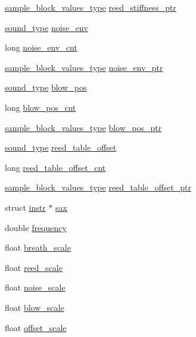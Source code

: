 \begin{DoxyCompactItemize}
\hyperlink{sound_8h_a83d17f7b465d1591f27cd28fc5eb8a03}{sample\+\_\+block\+\_\+values\+\_\+type} \hyperlink{structsax__all__susp__struct_af3fb547480291d7d9a161baf6c16c3d1}{reed\+\_\+stiffness\+\_\+ptr}
\item 
\hyperlink{sound_8h_a792cec4ed9d6d636d342d9365ba265ea}{sound\+\_\+type} \hyperlink{structsax__all__susp__struct_ae4c993c36179cc4d0f6c319f86007f02}{noise\+\_\+env}
\item 
long \hyperlink{structsax__all__susp__struct_ae586a3ae44f66cecbd89b0c68a4198e9}{noise\+\_\+env\+\_\+cnt}
\item 
\hyperlink{sound_8h_a83d17f7b465d1591f27cd28fc5eb8a03}{sample\+\_\+block\+\_\+values\+\_\+type} \hyperlink{structsax__all__susp__struct_a98c90436717cf4fa9f2798fa51d9fb25}{noise\+\_\+env\+\_\+ptr}
\item 
\hyperlink{sound_8h_a792cec4ed9d6d636d342d9365ba265ea}{sound\+\_\+type} \hyperlink{structsax__all__susp__struct_a43e48b71aecfb3d2c29da7ee0079f41b}{blow\+\_\+pos}
\item 
long \hyperlink{structsax__all__susp__struct_ac482b1d2e8c110eaf9712c5421832bb0}{blow\+\_\+pos\+\_\+cnt}
\item 
\hyperlink{sound_8h_a83d17f7b465d1591f27cd28fc5eb8a03}{sample\+\_\+block\+\_\+values\+\_\+type} \hyperlink{structsax__all__susp__struct_a01fa81e3e68d63eb98859deb8384995b}{blow\+\_\+pos\+\_\+ptr}
\item 
\hyperlink{sound_8h_a792cec4ed9d6d636d342d9365ba265ea}{sound\+\_\+type} \hyperlink{structsax__all__susp__struct_a8c1f538d26c0c1f302bdbf75bfdc82fe}{reed\+\_\+table\+\_\+offset}
\item 
long \hyperlink{structsax__all__susp__struct_a3c95a7afdd0c5d9294baf3b341a5a1e8}{reed\+\_\+table\+\_\+offset\+\_\+cnt}
\item 
\hyperlink{sound_8h_a83d17f7b465d1591f27cd28fc5eb8a03}{sample\+\_\+block\+\_\+values\+\_\+type} \hyperlink{structsax__all__susp__struct_a9b4dcf94814cb0b3aa44cde630ccbd4e}{reed\+\_\+table\+\_\+offset\+\_\+ptr}
\item 
struct \hyperlink{structinstr}{instr} $\ast$ \hyperlink{structsax__all__susp__struct_a31975f00ae677e624ebd3570bf31c1f4}{sax}
\item 
double \hyperlink{structsax__all__susp__struct_a7d59d64f8166f856788da2d10939ed44}{frequency}
\item 
float \hyperlink{structsax__all__susp__struct_ae1d88f7ead0d6847bf0815c1343cad3e}{breath\+\_\+scale}
\item 
float \hyperlink{structsax__all__susp__struct_aba6cc1acbdf8da4318fc3323e4b98f05}{reed\+\_\+scale}
\item 
float \hyperlink{structsax__all__susp__struct_ad5eee920c01e4d961e9b12b72e3403d9}{noise\+\_\+scale}
\item 
float \hyperlink{structsax__all__susp__struct_a988ee512eed882cd12bca7e3f5789b72}{blow\+\_\+scale}
\item 
float \hyperlink{structsax__all__susp__struct_a96f06f16fad64c3c198ca0a1df3ae44d}{offset\+\_\+scale}
\end{DoxyCompactItemize}


